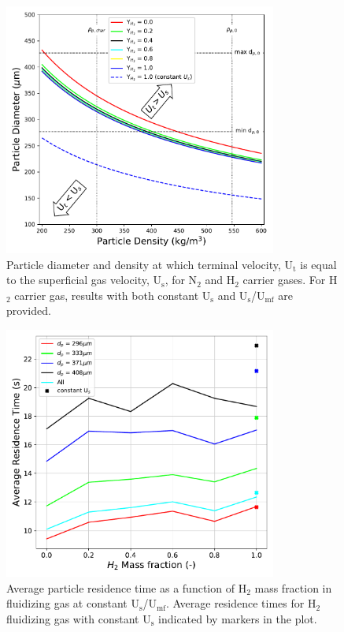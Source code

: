 \documentclass{article}
\begin{document}
\begin{figure}[H]
    \centering
    \includegraphics[width=0.8\textwidth]{figures/cfd-constuumf-terminal-vel.pdf}
    \caption{Particle diameter and density at which terminal velocity, U$_\text{t}$ is equal to the superficial gas velocity, U$_\text{s}$, for N$_2$ and H$_2$ carrier gases. For H$_2$ carrier gas, results with both constant U$_\text{s}$ and U$_\text{s}$/U$_\text{mf}$ are provided.}
    \label{fig:cfd-constuumf-terminal-vel}
\end{figure}

\begin{figure}[H]
    \centering
    \includegraphics[width=0.8\textwidth]{figures/cfd-constuumf-rtd.pdf}
    \caption{Average particle residence time as a function of H$_2$ mass fraction in fluidizing gas at constant U$_\text{s}$/U$_\text{mf}$. Average residence times for H$_2$ fluidizing gas with constant U$_\text{s}$ indicated by markers in the plot.}
    \label{fig:cfd-constuumf-rtd}
\end{figure}
\end{document}
